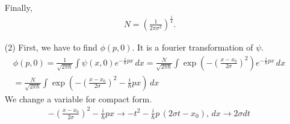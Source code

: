 \documentclass[aps,floatfix,nofootinbib,superscriptaddress,fleqn]{revtex4}
\begin{document}
\begin{itemize}
Finally,
\begin{align}
          \, N = {\left(\frac{1}{2\pi\sigma^2}\right)}^{\frac{1}{4}}.
\end{align}
\item[(2)] First, we have to find $\phi(p,0)$. It is a fourier transformation of $\psi$.
\begin{align}
          \phi(p,0)=\frac{1}{\sqrt{2\pi\hbar}}\int\psi(x,0) e^{-\frac{i}{\hbar}px}\,dx
          =\frac{N}{\sqrt{2\pi\hbar}}\int\exp\left(-{\left(\frac{x-x_0}{2\sigma}\right)}^2\right) e^{-\frac{i}{\hbar}px}\,dx
          \\=\frac{N}{\sqrt{2\pi\hbar}}\int\exp\left(-{\left(\frac{x-x_0}{2\sigma}\right)}^2-\frac{i}{\hbar}px\right)\,dx
\end{align}
We change a variable for compact form.
\begin{align}
  -{\left(\frac{x-x_0}{2\sigma}\right)}^2-\frac{i}{\hbar}px \longrightarrow -t^2-\frac{i}{\hbar}p\,\left(2\sigma t-x_0\right),\,dx \longrightarrow 2\sigma dt
\end{align}
 

\end{itemize}
\end{document}
